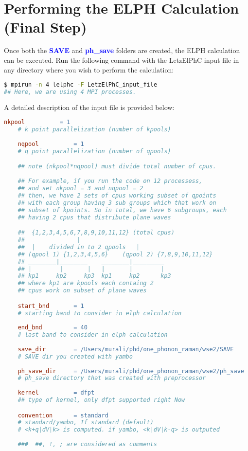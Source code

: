 \documentclass[12pt,twoside,openany]{book}
\begin{document}
\section{Performing the ELPH Calculation (Final Step)}
Once both the \textcolor{blue}{\bf{SAVE}} and \textcolor{blue}{\bf{ph\_save}} folders are created, 
the ELPH calculation can be executed. Run the following command with the LetzElPhC input file in any 
directory where you wish to perform the calculation:
\begin{lstlisting}[language=bash]
$ mpirun -n 4 lelphc -F LetzElPhC_input_file
## Here, we are using 4 MPI processes.
\end{lstlisting}
A detailed description of the input file is provided below:
\begin{lstlisting}[language=make]
    nkpool          = 1 
    # k point parallelization (number of kpools)
    
    nqpool          = 1
    # q point parallelization (number of qpools)

    ## note (nkpool*nqpool) must divide total number of cpus.
    
    ## For example, if you run the code on 12 processess, 
    ## and set nkpool = 3 and nqpool = 2
    ## then, we have 2 sets of cpus working subset of qpoints 
    ## with each group having 3 sub groups which that work on 
    ## subset of kpoints. So in total, we have 6 subgroups, each 
    ## having 2 cpus that distribute plane waves 

    ##  {1,2,3,4,5,6,7,8,9,10,11,12} (total cpus)
    ##   ____________|________________
    ##  |    divided in to 2 qpools   |
    ## (qpool 1) {1,2,3,4,5,6}    (qpool 2) {7,8,9,10,11,12}
    ## ________|________    ________|_________
    ## |        |       |   |       |        |
    ## kp1     kp2     kp3  kp1     kp2      kp3
    ## where kp1 are kpools each containg 2 
    ## cpus work on subset of plane waves

    start_bnd       = 1
    # starting band to consider in elph calculation
    
    end_bnd         = 40
    # last band to consider in elph calculation
    
    save_dir        = /Users/murali/phd/one_phonon_raman/wse2/SAVE
    # SAVE dir you created with yambo
    
    ph_save_dir     = /Users/murali/phd/one_phonon_raman/wse2/ph_save
    # ph_save directory that was created with preprocessor
    
    kernel          = dfpt
    ## type of kernel, only dfpt supported right Now

    convention      = standard 
    # standard/yambo, If standard (default) 
    # <k+q|dV|k> is computed. if yambo, <k|dV|k-q> is outputed 
    
    ###  ##, !, ; are considered as comments
\end{lstlisting}
\end{document}
